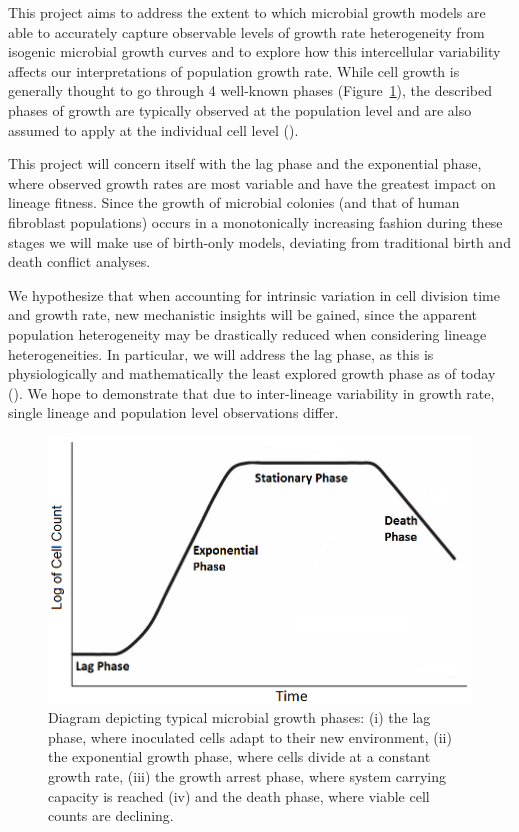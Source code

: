 \documentclass{bioinfo}
\begin{document}
This project aims to address the extent to which microbial growth models are able to accurately capture observable levels of growth rate heterogeneity from isogenic microbial growth curves and to explore how this intercellular variability affects our interpretations of population growth rate. While cell growth is generally thought to go through 4 well-known phases (Figure~\ref{fig:GrowthPhases}), the described phases of growth are typically observed at the population level and are also assumed to apply at the individual cell level (\citealp{Baranyi02}).

This project will concern itself with the lag phase and the exponential phase, where observed growth rates are most variable and have the greatest impact on lineage fitness. Since the growth of microbial colonies (and that of human fibroblast populations) occurs in a monotonically increasing fashion during these stages we will make use of birth-only models, deviating from traditional birth and death conflict analyses. 

We hypothesize that when accounting for intrinsic variation in cell division time and growth rate, new mechanistic insights will be gained, since the apparent population heterogeneity may be drastically reduced when considering lineage heterogeneities. In particular, we will address the lag phase, as this is physiologically and mathematically the least explored growth phase as of today (\citealp{Rolfe12}). We hope to demonstrate that due to inter-lineage variability in growth rate, single lineage and population level observations differ. 

\vspace{-1em}
\begin{figure}[H]
\includegraphics[width=0.92\linewidth]{GrowthPhases.png}
\caption{Diagram depicting typical microbial growth phases: (i) the lag phase, where inoculated cells adapt to their new environment, (ii) the exponential growth phase, where cells divide at a constant growth rate, (iii) the growth arrest phase, where system carrying capacity is reached (iv) and the death phase, where viable cell counts are declining.}
\label{fig:GrowthPhases}
\vspace{-3em}
\end{figure}
\end{document}

